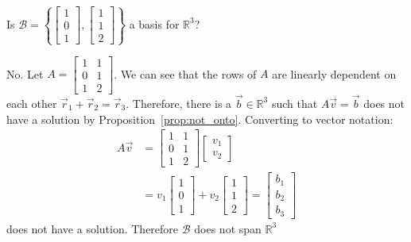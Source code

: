 \begin{example}
Is $\mathcal{B}=\left\{\begin{bmatrix}1 \\ 0 \\ 1 \end{bmatrix}, \begin{bmatrix}1 \\ 1 \\ 2 \end{bmatrix}\right\}$ a basis for $\mathbb{R}^3$?

No. Let $A=\begin{bmatrix}1 & 1 \\ 0 & 1 \\ 1 & 2 \end{bmatrix}$.  We can see that the rows of $A$ are linearly dependent on each other 
$\vec{r}_1+\vec{r}_2=\vec{r}_3$. Therefore, there is a $\vec{b} \in \mathbb{R}^3$ such that $A\vec{v}=\vec{b}$ does not have a solution by 
Proposition~\ref{prop:not_onto}. Converting to vector notation:
\begin{align*}
A\vec{v} &= \begin{bmatrix}1 & 1 \\ 0 & 1 \\ 1 & 2 \end{bmatrix}\begin{bmatrix}v_1 \\ v_2 \end{bmatrix} \\
&= 
v_1\begin{bmatrix}1 \\ 0 \\ 1 \end{bmatrix}+v_2\begin{bmatrix}1 \\ 1 \\ 2 \end{bmatrix}
=\begin{bmatrix}b_1 \\ b_2 \\ b_3\end{bmatrix}
\end{align*}
does not have a solution. Therefore $\mathcal{B}$ does not span $\mathbb{R}^3$
\end{example}
